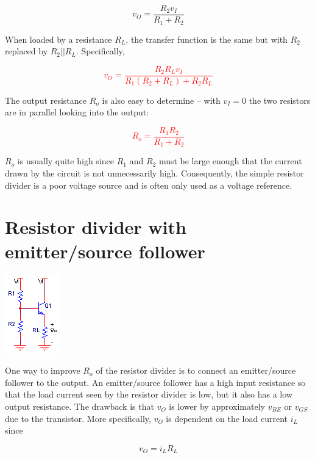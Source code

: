 \begin{equation}
v_{O} = \frac{R_{2}v_{I}}{R_{1}+R_{2}}
\end{equation}

\noindent When loaded by a resistance $R_{L}$, the transfer function is the same but with $R_{2}$ replaced by $R_{2}||R_{L}$. Specifically,

\textcolor{red}{
\begin{equation}
v_{O} = \frac{R_{2}R_{L}v_{I}}{R_{1}(R_{2}+R_{L})+R_{2}R_{L}}
\end{equation}
}

\noindent The output resistance $R_{o}$ is also easy to determine -- with $v_{I} = 0$ the two resistors are in parallel looking into the output:

\textcolor{red}{
\begin{equation}
R_{o} = \frac{R_{1}R_{2}}{R_{1}+R_{2}}
\end{equation}
}

\noindent $R_{o}$ is usually quite high since $R_{1}$ and $R_{2}$ must be large enough that the current drawn by the circuit is not unnecessarily high. Consequently, the simple resistor divider is a poor voltage source and is often only used as a voltage reference.

\section{Resistor divider with emitter/source follower}
\begin{center}
	\includegraphics{schematics/resistordivider_emitterfollower.PNG}
\end{center}

One way to improve $R_{o}$ of the resistor divider is to connect an emitter/source follower to the output. An emitter/source follower has a high input resistance so that the load current seen by the resistor divider is low, but it also has a low output resistance. The drawback is that $v_{O}$ is lower by approximately $v_{BE}$ or $v_{GS}$ due to the transistor. More specifically, $v_{O}$ is dependent on the load current $i_{L}$ since

\begin{equation}
v_{O} = i_{L}R_{L}
\end{equation}

